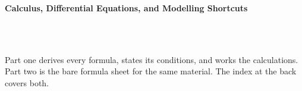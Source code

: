 



\makeindex[title={Index of This Volume},columns=2,intoc]

\begin{titlepage}\thispagestyle{empty}
\vspace*{0.14\textheight}
\noindent{\color{tiercore}\rule{\textwidth}{5pt}}\\[3pt]
\noindent{\color{bioline}\rule{\textwidth}{1pt}}\\[26pt]
\\[12pt]
\noindent\begin{minipage}{\textwidth}\raggedright
{\sffamily\bfseries\fontsize{28}{32}\selectfont\color{bioink}%
 \hyphenchar{} Calculus, Differential Equations, and Modelling Shortcuts\par}\end{minipage}\\[16pt]
\noindent{\color{biogreen}\rule{\textwidth}{1.4pt}}\\[10pt]
\noindent\begin{minipage}{\textwidth}\raggedright
{\fontsize{10.5}{14}\selectfont\color{biogreen}%
Part one derives every formula, states its conditions, and works the calculations. Part two is the
bare formula sheet for the same material. The index at the back covers both.\par}\end{minipage}
\vfill
\noindent{\color{bioline}\rule{\textwidth}{1pt}}\\[3pt]
\noindent{\color{tiercore}\rule{\textwidth}{5pt}}
\end{titlepage}
\tableofcontents
\clearpage
{}
\clearpage
\printindex

